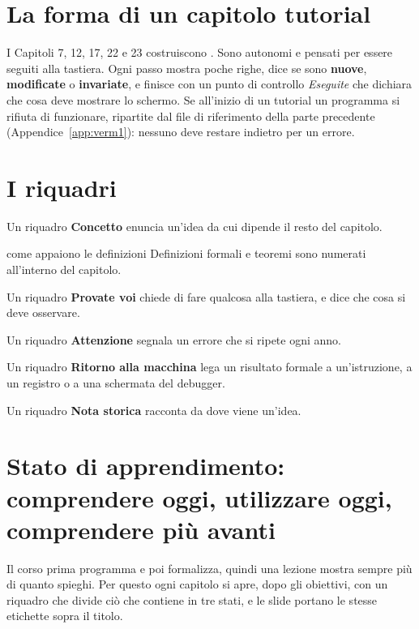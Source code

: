 \section*{La forma di un capitolo tutorial}

I Capitoli 7, 12, 17, 22 e 23 costruiscono \vermone. Sono autonomi e pensati
per essere seguiti alla tastiera. Ogni passo mostra poche righe, dice se sono
\textbf{nuove}, \textbf{modificate} o \textbf{invariate}, e finisce con un
punto di controllo \emph{Eseguite} che dichiara che cosa deve mostrare lo
schermo. Se all'inizio di un tutorial un programma si rifiuta di funzionare,
ripartite dal file di riferimento della parte precedente
(Appendice~\ref{app:verm1}): nessuno deve restare indietro per un errore.

\section*{I riquadri}

\begin{prgconcept}
Un riquadro \textbf{Concetto} enuncia un'idea da cui dipende il resto del
capitolo.
\end{prgconcept}
\begin{definition}{come appaiono le definizioni}
Definizioni formali e teoremi sono numerati all'interno del capitolo.
\end{definition}
\begin{prgtry}
Un riquadro \textbf{Provate voi} chiede di fare qualcosa alla tastiera, e dice
che cosa si deve osservare.
\end{prgtry}
\begin{prgwarn}
Un riquadro \textbf{Attenzione} segnala un errore che si ripete ogni anno.
\end{prgwarn}
\begin{prgmachine}
Un riquadro \textbf{Ritorno alla macchina} lega un risultato formale a
un'istruzione, a un registro o a una schermata del debugger.
\end{prgmachine}
\begin{prgaside}
Un riquadro \textbf{Nota storica} racconta da dove viene un'idea.
\end{prgaside}

\section*{Stato di apprendimento: comprendere oggi, utilizzare oggi, comprendere più avanti}

Il corso prima programma e poi formalizza, quindi una lezione mostra sempre più di quanto
spieghi. Per questo ogni capitolo si apre, dopo gli obiettivi, con un riquadro che divide ciò
che contiene in tre stati, e le slide portano le stesse etichette sopra il titolo.

